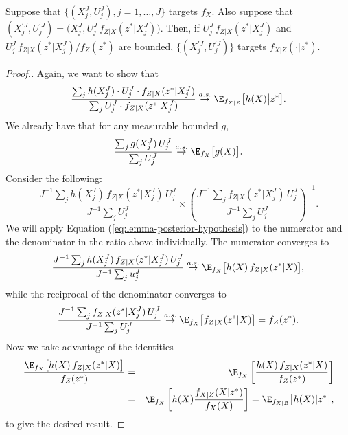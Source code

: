 \begin{lem}
    \label{lem:posterior-proper-weights}
    Suppose that $\{(X_j^J,U_j^J),j=1,\dots,J\}$ targets $f_X$.
    Also suppose that $(X^{\prime J}_j,U^{\prime J}_j) = \big(X_j^J,U_j^J \, f_{Z|X}(z^*|X_j^J)\big)$. 
    Then, if $U_j^J \, f_{Z|X}(z^*|X_j^J)$ and $U_j^J \, f_{Z|X}(z^*|X_j^J) \big/ f_Z(z^*)$ are bounded, $\{(X^{\prime J}_j,U^{\prime J}_j)\}$ targets $f_{X|Z}(\cdot | z^*)$.
\end{lem}

\begin{proof}[Proof.]
    Again, we want to show that
     \begin{equation}
     \frac{\sum_j h(X_j^J) \cdot U_j^J \cdot f_{Z|X}(z^*|X_j^J)}{\sum_j U_j^J \cdot f_{Z|X}(z^*|X_j^J)} \stackrel{a.s.}{\to} \E_{f_{X|Z}}\big[h(X)\big|z^*\big].
     \end{equation}
    We already have that for any measurable bounded $g$,
    \begin{equation}
        \frac{\sum_j g(X_j^J)\, U_j^J}{\sum_j U_j^J} \stackrel{a.s.}{\to} \E_{f_X}\big[g(X)\big].
        \label{eq:lemma-posterior-hypothesis}
    \end{equation}
    Consider the following:
    \begin{equation}
    \frac{J^{-1} \sum_j h(X_j^J) \, f_{Z|X}(z^*|X_j^J)\,  {U}_j^{J}}{J^{-1} \sum_j {U}_j^{J}}
    \times \left( \frac{J^{-1} \sum_j f_{Z|X}(z^*|X_j^J) \, {U}_j^{J}}{J^{-1} \sum_j {U}_j^{J}} \right)^{-1}.
    \end{equation}
    We will apply Equation (\ref{eq:lemma-posterior-hypothesis}) to the numerator and the denominator in the ratio above individually. The numerator converges to 
    \begin{equation}
    \frac{J^{-1} \sum_j h(X_j^J) \, f_{Z|X}(z^*|X_j^J) \, {U}_j^{J}}{J^{-1} \sum_j {u}_j^{J}} \stackrel{a.s.}{\to} \E_{f_X}\big[h(X)\, f_{Z|X}(z^*|X)\big],
    \end{equation}
    while the reciprocal of the denominator converges to 
    \begin{equation} 
    \frac{J^{-1} \sum_j f_{Z|X}(z^*|X_j^J) \, {U}_j^{J}}{J^{-1} \sum_j {U}_j^{J}}  \stackrel{a.s.}{\to} \E_{f_X}\big[f_{Z|X}(z^*|X)\big] = f_Z(z^*).
    \end{equation}
    Now we take advantage of the identities
    \begin{eqnarray}
    \frac{\E_{f_X}\big[h(X)\, f_{Z|X}(z^*|X)\big]}{f_Z(z^*)} &=& \E_{f_X}\left[\frac{h(X)\, f_{Z|X}(z^*|X)}{f_Z(z^*)}\right] 
    \\
    &=& \E_{f_X}\left[h(X)\frac{f_{X|Z}(X|z^*)}{f_X(X)}\right] =  \E_{f_{X|Z}}\big[h(X)|z^*\big],
    \end{eqnarray}
    to give the desired result.
    

\end{proof}
